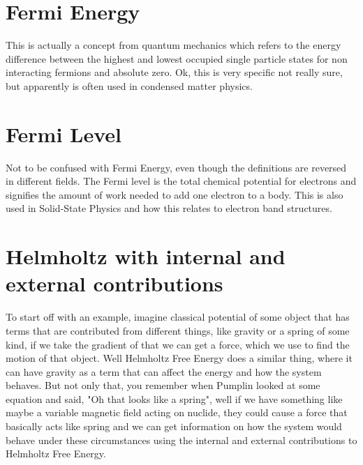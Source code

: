 \documentclass[arial]{article}
\begin{document}
\section*{Fermi Energy}
This is actually a concept from quantum mechanics which refers to the energy difference between the highest and lowest occupied single particle states for non interacting fermions and absolute zero. Ok, this is very specific not really sure, but apparently is often used in condensed matter physics.

\section*{Fermi Level}
Not to be confused with Fermi Energy, even though the definitions are reversed in different fields. The Fermi level is the total chemical potential for electrons and signifies the amount of work needed to add one electron to a body. This is also used in Solid-State Physics and how this relates to electron band structures.

\section*{Helmholtz with internal and external contributions}
To start off with an example, imagine classical potential of some object that has terms that are contributed from different things, like gravity or a spring of some kind, if we take the gradient of that we can get a force, which we use to find the motion of that object. Well Helmholtz Free Energy does a similar thing, where it can have gravity as a term that can affect the energy and how the system behaves. But not only that, you remember when Pumplin looked at some equation and said, "Oh that looks like a spring", well if we have something like maybe a variable magnetic field acting on nuclide, they could cause a force that basically acts like spring and we can get information on how the system would behave under these circumstances using the internal and external contributions to Helmholtz Free Energy.
\end{document}
